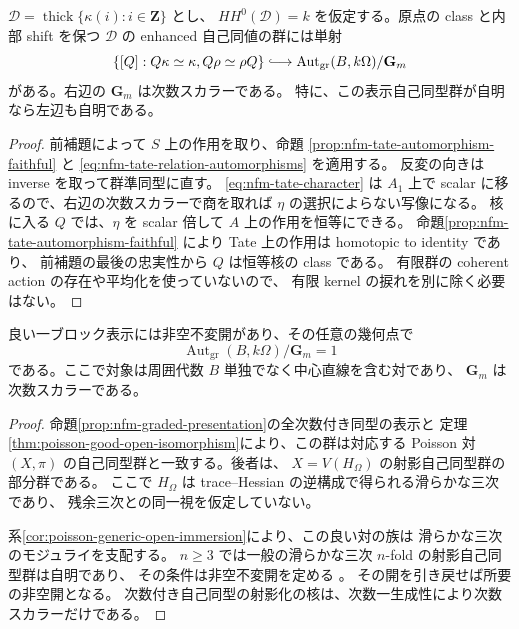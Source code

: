 \begin{theorem}
\label{thm:nfm-origin-rotation-faithful}
$\mathcal D=\operatorname{thick}\{\kappa(i):i\in\mathbf Z\}$ とし、
$HH^0(\mathcal D)=k$ を仮定する。原点の class と内部 shift を保つ
$\mathcal D$ の enhanced 自己同値の群には単射
\begin{equation}\label{eq:nfm-origin-rotation-faithful}
\{[Q]:Q\kappa\simeq\kappa, Q\rho\simeq\rho Q\}
 \lhook\joinrel\longrightarrow
 \operatorname{Aut}_{\mathrm{gr}}(B,k\Omega)/\mathbf G_m
\end{equation}
がある。右辺の $\mathbf G_m$ は次数スカラーである。
特に、この表示自己同型群が自明なら左辺も自明である。
\end{theorem}

\begin{proof}
前補題によって $S$ 上の作用を取り、命題
\ref{prop:nfm-tate-automorphism-faithful} と \eqref{eq:nfm-tate-relation-automorphisms} を適用する。
反変の向きは inverse を取って群準同型に直す。
\eqref{eq:nfm-tate-character} は $A_1$ 上で scalar に移るので、右辺の次数スカラーで商を取れば
$\eta$ の選択によらない写像になる。
核に入る $Q$ では、$\eta$ を scalar 倍して $A$ 上の作用を恒等にできる。
命題\ref{prop:nfm-tate-automorphism-faithful} により Tate 上の作用は homotopic to identity であり、
前補題の最後の忠実性から $Q$ は恒等核の class である。
有限群の coherent action の存在や平均化を使っていないので、
有限 kernel の捩れを別に除く必要はない。
\end{proof}

\begin{lemma}[一般一ブロック対の表示安定化子]
\label{lem:nfm-generic-presentation-stabilizer-trivial}
良い一ブロック表示には非空不変開があり、その任意の幾何点で
\[
 \operatorname{Aut}_{\mathrm{gr}}(B,k\Omega)/\mathbf G_m=1
\]
である。ここで対象は周囲代数 $B$ 単独でなく中心直線を含む対であり、
$\mathbf G_m$ は次数スカラーである。
\end{lemma}

\begin{proof}
命題\ref{prop:nfm-graded-presentation}の全次数付き同型の表示と
定理\ref{thm:poisson-good-open-isomorphism}により、この群は対応する
Poisson 対 $(X,\pi)$ の自己同型群と一致する。後者は、
$X=V(H_\Omega)$ の射影自己同型群の部分群である。
ここで $H_\Omega$ は trace--Hessian の逆構成で得られる滑らかな三次であり、
残余三次との同一視を仮定していない。

系\ref{cor:poisson-generic-open-immersion}により、この良い対の族は
滑らかな三次のモジュライを支配する。
$n\ge3$ では一般の滑らかな三次 $n$-fold の射影自己同型群は自明であり、
その条件は非空不変開を定める
\cite[Theorem~1.5 and the preceding paragraph]{NFMPoonenAutomorphisms}。
その開を引き戻せば所要の非空開となる。
次数付き自己同型の射影化の核は、次数一生成性により次数スカラーだけである。
\end{proof}

